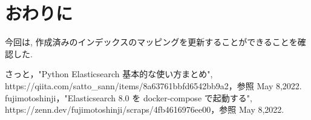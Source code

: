 \documentclass[a4j,12pt,]{jarticle}
\begin{document}
\section{おわりに}
今回は, 作成済みのインデックスのマッピングを更新することができることを確認した.

\begin{thebibliography}{5}
  さっと，"Python Elasticsearch 基本的な使い方まとめ",\\ https://qiita.com/satto\_sann/items/8a63761bbfd6542bb9a2，参照 May 8,2022.
  fujimotoshinji，"Elasticsearch 8.0 を docker-compose で起動する",\\ https://zenn.dev/fujimotoshinji/scraps/4fb4616976ee00，参照 May 8,2022.
\end{thebibliography}
\end{document}
